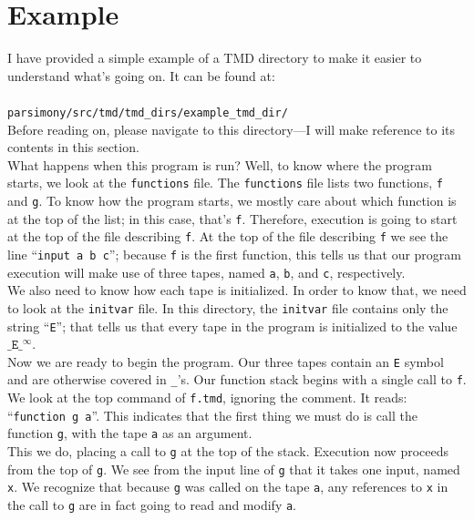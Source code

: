 \documentclass[11pt]{article}
\begin{document}
\section{Example}

I have provided a simple example of a TMD directory to make it easier to understand what's going on. It can be found at: \\ \\
\texttt{parsimony/src/tmd/tmd\_dirs/example\_tmd\_dir/} \\ 

Before reading on, please navigate to this directory---I will make reference to its contents in this section. \\

What happens when this program is run? Well, to know where the program starts, we look at the \texttt{functions} file. The \texttt{functions} file lists two functions, \texttt{f} and \texttt{g}. To know how the program starts, we mostly care about which function is at the top of the list; in this case, that's \texttt{f}. Therefore, execution is going to start at the top of the file describing \texttt{f}. At the top of the file describing \texttt{f} we see the line ``\texttt{input a b c}''; because \texttt{f} is the first function, this tells us that our program execution will make use of three tapes, named \texttt{a}, \texttt{b}, and \texttt{c}, respectively. \\

We also need to know how each tape is initialized. In order to know that, we need to look at the \texttt{initvar} file. In this directory, the \texttt{initvar} file contains only the string ``\texttt{E}''; that tells us that every tape in the program is initialized to the value $\texttt{\_E\_}^\infty$. \\

Now we are ready to begin the program. Our three tapes contain an \texttt{E} symbol and are otherwise covered in \texttt{\_}'s. Our function stack begins with a single call to \texttt{f}. We look at the top command of \texttt{f.tmd}, ignoring the comment. It reads: ``\texttt{function g a}''. This indicates that the first thing we must do is call the function \texttt{g}, with the tape \texttt{a} as an argument. \\

This we do, placing a call to \texttt{g} at the top of the stack. Execution now proceeds from the top of \texttt{g}. We see from the input line of \texttt{g} that it takes one input, named \texttt{x}. We recognize that because \texttt{g} was called on the tape \texttt{a}, any references to \texttt{x} in the call to \texttt{g} are in fact going to read and modify \texttt{a}. \\
\end{document}
